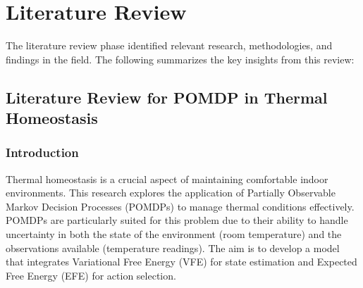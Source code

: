 \documentclass[11pt,a4paper]{article}
\begin{document}
\section{Literature Review}

The literature review phase identified relevant research, methodologies, and findings in the field. The following summarizes the key insights from this review:

\subsection{Literature Review for POMDP in Thermal Homeostasis}

\subsubsection{Introduction}
Thermal homeostasis is a crucial aspect of maintaining comfortable indoor environments. This research explores the application of Partially Observable Markov Decision Processes (POMDPs) to manage thermal conditions effectively. POMDPs are particularly suited for this problem due to their ability to handle uncertainty in both the state of the environment (room temperature) and the observations available (temperature readings). The aim is to develop a model that integrates Variational Free Energy (VFE) for state estimation and Expected Free Energy (EFE) for action selection.
\end{document}
